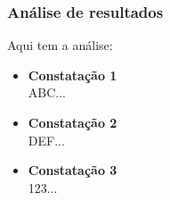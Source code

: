 \subsubsection{Análise de resultados}
Aqui tem a análise:

\begin{itemize}
    \item[] \textbf{Constatação 1} \\
        ABC...
    
    \item[] \textbf{Constatação 2} \\
        DEF...

    \item[] \textbf{Constatação 3} \\
        123...

\end{itemize}
